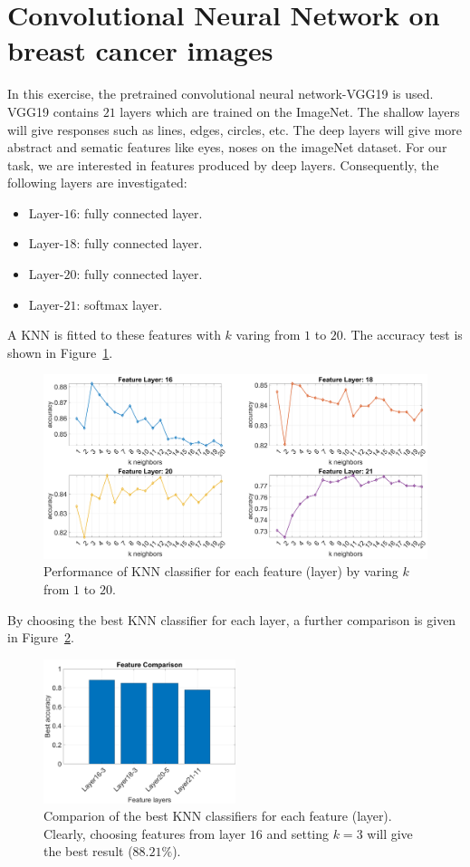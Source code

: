 \documentclass[a4paper]{article}
\begin{document}
	\section{Convolutional Neural Network on breast cancer images}
	In this exercise, the pretrained convolutional neural network-VGG19 is used. VGG19 contains $21$ layers which are trained on the ImageNet. The shallow layers will give responses such as lines, edges, circles, etc. The deep layers will give more abstract and sematic features like eyes, noses on the imageNet dataset. For our task, we are interested in features produced by deep layers. Consequently, the following layers are investigated:
	\begin{itemize}
		\item Layer-$16$: fully connected layer.
		\item Layer-$18$: fully connected layer.
		\item Layer-$20$: fully connected layer.
		\item Layer-$21$: softmax layer.
	\end{itemize}
	A KNN is fitted to these features with $k$ varing from $1$ to $20$. The accuracy test is shown in Figure~\ref{figknn}.
	\begin{figure}[ht]
		\centering
		\includegraphics[width=.9\textwidth]{figures/ex5_1.png}
		\caption{Performance of KNN classifier for each feature (layer) by varing $k$ from $1$ to $20$.}
		\label{figknn}
	\end{figure}
	By choosing the best KNN classifier for each layer, a further comparison is given in Figure~\ref{figknn2}.
	\begin{figure}[ht]
	\centering
	\includegraphics[width=0.5\textwidth]{figures/ex5_2.png}
	\caption{Comparion of the best KNN classifiers for each feature (layer). Clearly, choosing features from layer $16$ and setting $k=3$ will give the best result ($88.21\%$).}
	\label{figknn2}
\end{figure}
\end{document}
